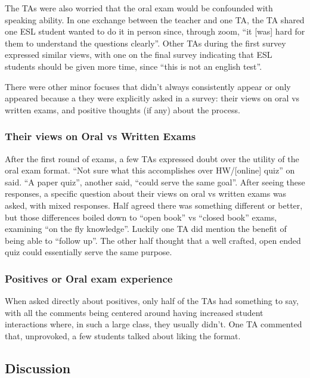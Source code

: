 \documentclass[
  letterpaper,
  DIV=11,
  numbers=noendperiod]{scrartcl}
\begin{document}
The TAs were also worried that the oral exam would be confounded with
speaking ability. In one exchange between the teacher and one TA, the TA
shared one ESL student wanted to do it in person since, through zoom,
``it {[}was{]} hard for them to understand the questions clearly''.
Other TAs during the first survey expressed similar views, with one on
the final survey indicating that ESL students should be given more time,
since ``this is not an english test''.

There were other minor focuses that didn't always consistently appear or
only appeared because a they were explicitly asked in a survey: their
views on oral vs written exams, and positive thoughts (if any) about the
process.

\hypertarget{their-views-on-oral-vs-written-exams}{%
\subsubsection{Their views on Oral vs Written
Exams}\label{their-views-on-oral-vs-written-exams}}

After the first round of exams, a few TAs expressed doubt over the
utility of the oral exam format. ``Not sure what this accomplishes over
HW/{[}online{]} quiz'' on said. ``A paper quiz'', another said, ``could
serve the same goal''. After seeing these responses, a specific question
about their views on oral vs written exams was asked, with mixed
responses. Half agreed there was something different or better, but
those differences boiled down to ``open book'' vs ``closed book'' exams,
examining ``on the fly knowledge''. Luckily one TA did mention the
benefit of being able to ``follow up''. The other half thought that a
well crafted, open ended quiz could essentially serve the same purpose.

\hypertarget{positives-or-oral-exam-experience}{%
\subsubsection{Positives or Oral exam
experience}\label{positives-or-oral-exam-experience}}

When asked directly about positives, only half of the TAs had something
to say, with all the comments being centered around having increased
student interactions where, in such a large class, they usually didn't.
One TA commented that, unprovoked, a few students talked about liking
the format.

\hypertarget{discussion}{%
\subsection{Discussion}\label{discussion}}
\end{document}
